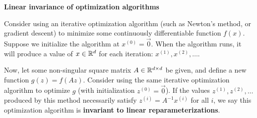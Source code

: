 \item {} {\bf Linear invariance of optimization algorithms}

Consider using an iterative optimization algorithm (such as Newton's method,
or gradient descent) to minimize some continuously differentiable
function $f(x)$.  Suppose we initialize the algorithm at $x^{(0)} = \vec{0}$.
When the algorithm
runs, it will produce a value of $x \in {\mathbb R}^{d}$ for each iteration:
$x^{(1)}, x^{(2)}, \ldots$.

Now, let some non-singular square matrix $A \in {\mathbb R}^{{d}\times {d}}$ be given, and
define a new function $g(z) = f(Az)$.  Consider using
the same iterative optimization algorithm to optimize $g$ (with initialization
$z^{(0)} = \vec{0}$). If the values $z^{(1)}, z^{(2)}, \ldots$ produced by this
method necessarily satisfy $z^{(i)} = A^{-1}x^{(i)}$ for all $i$, we say this
optimization algorithm is {\bf invariant to linear reparameterizations}.


\begin{enumerate}
        
        \ifnum{}
                
        \fi

        
        \ifnum{}
                
        \fi

\end{enumerate}
